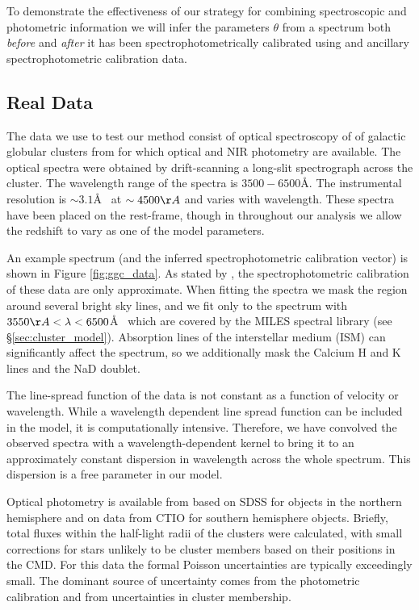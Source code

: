 \documentclass[iop,numberedappendix]{emulateapj}
\begin{document}
To demonstrate the effectiveness of our strategy for combining
spectroscopic and photometric information we will infer the parameters
$\theta$ from a spectrum both \emph{before} and \emph{after} it has
been spectrophotometrically calibrated using and ancillary
spectrophotometric calibration data.


\subsection{Real Data}

The data we use to test our method consist of optical spectroscopy of
of galactic globular clusters from \citet{schiavon05} for which
optical and NIR photometry are available. The optical spectra were
obtained by drift-scanning a long-slit spectrograph across the
cluster.  The wavelength range of the spectra is $3500-6500$\AA. The
instrumental resolution is $\sim 3.1$\AA~ at $\sim 4500\AA$ and varies
with wavelength.  These spectra have been placed on the rest-frame,
though in throughout our analysis we allow the redshift to vary as one
of the model parameters. 

An example spectrum (and the inferred spectrophotometric calibration
vector) is shown in Figure \ref{fig:ggc_data}.  As stated by
\citet{schiavon05}, the spectrophotometric calibration of these data
are only approximate.  When fitting the spectra we mask the region
around  several bright sky lines, and we fit only to the spectrum
with $3550\AA < \lambda < 6500$\AA~ which are covered by the MILES
spectral library (see \S\ref{sec:cluster_model}).  Absorption lines of
the interstellar medium (ISM) can significantly affect the spectrum,
so we additionally mask the Calcium H and K lines and the NaD doublet.

The line-spread function of the data is not constant as a function of
velocity or wavelength.  While a wavelength dependent line spread
function can be included in the model, it is computationally
intensive. Therefore, we have convolved the observed spectra with a
wavelength-dependent kernel to bring it to an approximately constant
dispersion in wavelength across the whole spectrum. This dispersion is
a free parameter in our model.

Optical photometry is available from \citep{vanderbeke14} based on
SDSS for objects in the northern hemisphere and on data from CTIO for
southern hemisphere objects.  Briefly, total fluxes within the half-light radii
of the clusters \citet{harris98} were calculated, with small
corrections for stars unlikely to be cluster members based on their
positions in the CMD. For this data the formal Poisson uncertainties
are typically exceedingly small.  The dominant source of uncertainty
comes from the photometric calibration and from uncertainties in
cluster membership.
\end{document}
